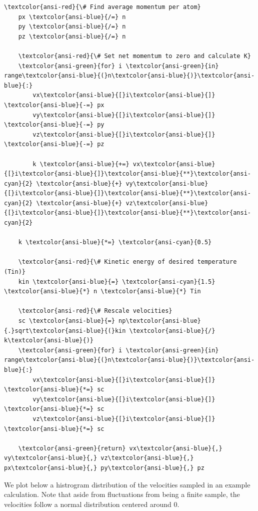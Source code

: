 \documentclass[11pt]{article}
\begin{document}
\begin{Verbatim}[commandchars=\\\{\}]
    \textcolor{ansi-red}{\# Find average momentum per atom}
    px \textcolor{ansi-blue}{/=} n
    py \textcolor{ansi-blue}{/=} n
    pz \textcolor{ansi-blue}{/=} n

    \textcolor{ansi-red}{\# Set net momentum to zero and calculate K}
    \textcolor{ansi-green}{for} i \textcolor{ansi-green}{in} range\textcolor{ansi-blue}{(}n\textcolor{ansi-blue}{)}\textcolor{ansi-blue}{:}
        vx\textcolor{ansi-blue}{[}i\textcolor{ansi-blue}{]} \textcolor{ansi-blue}{-=} px
        vy\textcolor{ansi-blue}{[}i\textcolor{ansi-blue}{]} \textcolor{ansi-blue}{-=} py
        vz\textcolor{ansi-blue}{[}i\textcolor{ansi-blue}{]} \textcolor{ansi-blue}{-=} pz

        k \textcolor{ansi-blue}{+=} vx\textcolor{ansi-blue}{[}i\textcolor{ansi-blue}{]}\textcolor{ansi-blue}{**}\textcolor{ansi-cyan}{2} \textcolor{ansi-blue}{+} vy\textcolor{ansi-blue}{[}i\textcolor{ansi-blue}{]}\textcolor{ansi-blue}{**}\textcolor{ansi-cyan}{2} \textcolor{ansi-blue}{+} vz\textcolor{ansi-blue}{[}i\textcolor{ansi-blue}{]}\textcolor{ansi-blue}{**}\textcolor{ansi-cyan}{2}

    k \textcolor{ansi-blue}{*=} \textcolor{ansi-cyan}{0.5}

    \textcolor{ansi-red}{\# Kinetic energy of desired temperature (Tin)}
    kin \textcolor{ansi-blue}{=} \textcolor{ansi-cyan}{1.5} \textcolor{ansi-blue}{*} n \textcolor{ansi-blue}{*} Tin

    \textcolor{ansi-red}{\# Rescale velocities}
    sc \textcolor{ansi-blue}{=} np\textcolor{ansi-blue}{.}sqrt\textcolor{ansi-blue}{(}kin \textcolor{ansi-blue}{/} k\textcolor{ansi-blue}{)}
    \textcolor{ansi-green}{for} i \textcolor{ansi-green}{in} range\textcolor{ansi-blue}{(}n\textcolor{ansi-blue}{)}\textcolor{ansi-blue}{:}
        vx\textcolor{ansi-blue}{[}i\textcolor{ansi-blue}{]} \textcolor{ansi-blue}{*=} sc
        vy\textcolor{ansi-blue}{[}i\textcolor{ansi-blue}{]} \textcolor{ansi-blue}{*=} sc
        vz\textcolor{ansi-blue}{[}i\textcolor{ansi-blue}{]} \textcolor{ansi-blue}{*=} sc

    \textcolor{ansi-green}{return} vx\textcolor{ansi-blue}{,} vy\textcolor{ansi-blue}{,} vz\textcolor{ansi-blue}{,} px\textcolor{ansi-blue}{,} py\textcolor{ansi-blue}{,} pz

    \end{Verbatim}

    
    We plot below a histrogram distribution of the velocities sampled in an
example calculation. Note that aside from fluctuations from being a
finite sample, the velocities follow a normal distribution centered
around 0.
\end{document}
